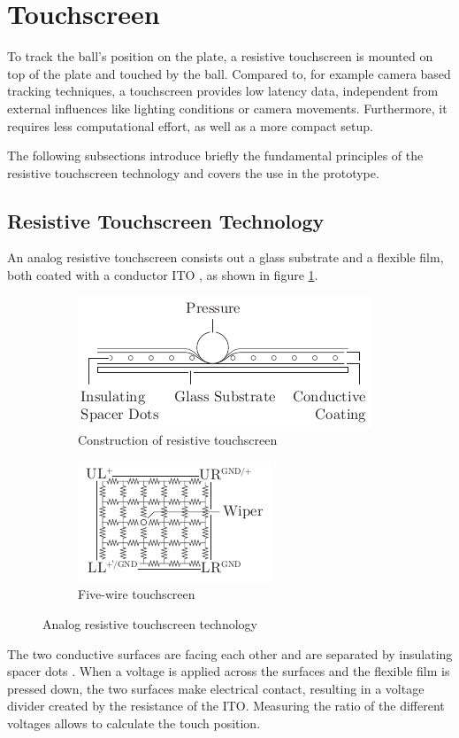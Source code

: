 \section{Touchscreen}
To track the ball's position on the plate, a resistive touchscreen is mounted
on top of the plate and touched by the ball. Compared to, for example camera
based tracking techniques, a touchscreen provides low latency data,
independent from external influences like lighting conditions or camera
movements. Furthermore, it requires less computational effort, as well as a
more compact setup.

The following subsections introduce briefly the fundamental principles of the
resistive touchscreen technology and covers the use in the prototype.

\subsection{Resistive Touchscreen Technology}
An analog resistive touchscreen consists out a glass substrate and a flexible
film, both coated with a conductor \ac{ITO} \citep{Wal12}, as shown in figure
\ref{fig:touch_build}.
\begin{figure}
	\centering
	\begin{subfigure}{0.49\textwidth}
		\centering
		\includegraphics{../figures/touch_build}
		\caption{Construction of resistive touchscreen}
		\label{fig:touch_build}
	\end{subfigure}
	\begin{subfigure}{0.49\textwidth}
		\centering
		\includegraphics{../figures/touch_five}
		\caption{Five-wire touchscreen}
		\label{fig:touch_five}
	\end{subfigure}
	\caption{Analog resistive touchscreen technology \citep[adapted from][]{Wal12}}
	\label{fig:touch}
\end{figure}
The two conductive surfaces are facing each other and
are separated by insulating spacer dots \citep{Wal12}. When a voltage is
applied across the surfaces and the flexible film is pressed down, the two
surfaces make electrical contact, resulting in a voltage divider created by
the resistance of the \ac{ITO}. Measuring the ratio of the different voltages
allows to calculate the touch position.

